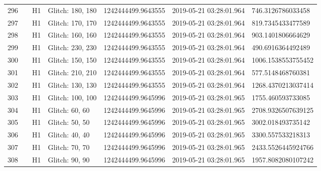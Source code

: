 \begin{longtable}{lllllll}
296  &                                                    &       H1 &  Glitch: 180, 180 &  1242444499.9643555 &  2019-05-21 03:28:01.964 &   746.3126786033458 \\
297  &                                                    &       H1 &  Glitch: 170, 170 &  1242444499.9643555 &  2019-05-21 03:28:01.964 &   819.7345433477589 \\
298  &                                                    &       H1 &  Glitch: 160, 160 &  1242444499.9643555 &  2019-05-21 03:28:01.964 &   903.1401806664629 \\
299  &                                                    &       H1 &  Glitch: 230, 230 &  1242444499.9643555 &  2019-05-21 03:28:01.964 &   490.6916364492489 \\
300  &                                                    &       H1 &  Glitch: 150, 150 &  1242444499.9643555 &  2019-05-21 03:28:01.964 &  1006.1538553755452 \\
301  &                                                    &       H1 &  Glitch: 210, 210 &  1242444499.9643555 &  2019-05-21 03:28:01.964 &   577.5148468760381 \\
302  &                                                    &       H1 &  Glitch: 130, 130 &  1242444499.9643555 &  2019-05-21 03:28:01.964 &  1268.4370213037414 \\
303  &                                                    &       H1 &  Glitch: 100, 100 &  1242444499.9645996 &  2019-05-21 03:28:01.965 &   1755.460593733085 \\
304  &                                                    &       H1 &    Glitch: 60, 60 &  1242444499.9645996 &  2019-05-21 03:28:01.965 &  2708.9326507639125 \\
305  &                                                    &       H1 &    Glitch: 50, 50 &  1242444499.9645996 &  2019-05-21 03:28:01.965 &   3002.018493735142 \\
306  &                                                    &       H1 &    Glitch: 40, 40 &  1242444499.9645996 &  2019-05-21 03:28:01.965 &   3300.557533218313 \\
307  &                                                    &       H1 &    Glitch: 70, 70 &  1242444499.9645996 &  2019-05-21 03:28:01.965 &  2433.5526445924766 \\
308  &                                                    &       H1 &    Glitch: 90, 90 &  1242444499.9645996 &  2019-05-21 03:28:01.965 &  1957.8082080107242 \\

\end{longtable}
